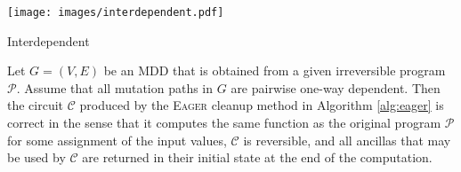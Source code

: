 \begin{marginfigure}
  \texttt{[image: images/interdependent.pdf]}
  \caption{Interdependent}
  \label{fig:interdep}
\end{marginfigure}

\begin{theorem}

Let $G=(V,E)$ be an MDD that is obtained from a given irreversible program
${\mathcal P}$.  Assume that all mutation paths in $G$ are pairwise one-way
dependent.  Then the circuit ${\mathcal C}$ produced by the \textsc{Eager}
cleanup method in Algorithm \ref{alg:eager} is correct in the sense that it
computes the same function as the original program ${\mathcal P}$ for some
assignment of the input values, ${\mathcal C}$ is reversible, and all ancillas
that may be used by ${\mathcal C}$ are returned in their initial state at the
end of the computation.

\end{theorem}

